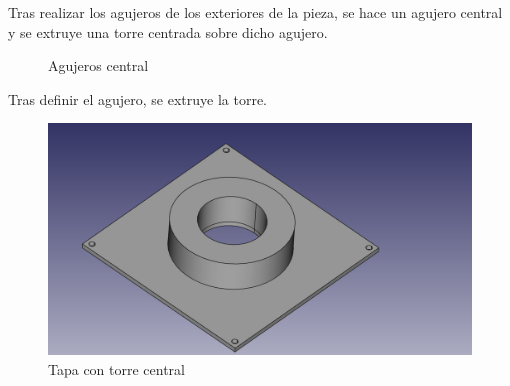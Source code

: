 Tras realizar los agujeros de los exteriores de la pieza, se hace un agujero central y se extruye una torre centrada sobre dicho agujero.

\begin{figure}[H]
\centering
{}
\caption{Agujeros central}
\label{fig:agujeros_central_tapa_superior}
\end{figure}

Tras definir el agujero, se extruye la torre.

\begin{figure}[H]
    \centering
    \includegraphics[width=.9\linewidth]{pictures/TorreCentral.png}
    \caption{Tapa con torre central}
    \label{fig:torre_central_tapa_superior}
\end{figure}

